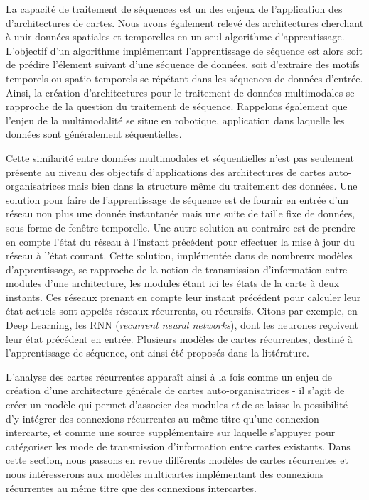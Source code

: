 \documentclass[../main]{subfiles}
\begin{document}
La capacité de traitement de séquences est un des enjeux de l'application des d'architectures de cartes. Nous avons également relevé des architectures cherchant à unir données spatiales et temporelles en un seul algorithme d'apprentissage. L'objectif d'un algorithme implémentant l'apprentissage de séquence est alors soit de prédire l'élement suivant d'une séquence de données, soit d'extraire des motifs temporels ou spatio-temporels se répétant dans les séquences de données d'entrée.
Ainsi, la création d'architectures pour le traitement de données multimodales se rapproche de la question du traitement de séquence. Rappelons également que l'enjeu de la multimodalité se situe en robotique, application dans laquelle les données sont généralement séquentielles.


Cette similarité entre données multimodales et séquentielles n'est pas seulement présente au niveau des objectifs d'applications des architectures de cartes auto-organisatrices mais bien dans la structure même du traitement des données. 
Une solution pour faire de l'apprentissage de séquence est de fournir en entrée d'un réseau non plus une donnée instantanée mais une suite de taille fixe de données, sous forme de fenêtre temporelle.
Une autre solution au contraire est de prendre en compte l'état du réseau à l'instant précédent pour effectuer la mise à jour du réseau à l'état courant. Cette solution, implémentée dans de nombreux modèles d'apprentissage, se rapproche de la notion de transmission d'information entre modules d'une architecture, les modules étant ici les états de la carte à deux instants. Ces réseaux prenant en compte leur instant précédent pour calculer leur état actuels sont appelés réseaux récurrents, ou récursifs. Citons par exemple, en Deep Learning, les RNN (\emph{recurrent neural networks}), dont les neurones reçoivent leur état précédent en entrée.
Plusieurs modèles de cartes récurrentes, destiné à l'apprentissage de séquence, ont ainsi été proposés dans la littérature.


L'analyse des cartes récurrentes apparaît ainsi à la fois comme un enjeu de création d'une architecture générale de cartes auto-organisatrices - il s'agit de créer un modèle qui permet d'associer des modules \emph{et} de se laisse la possibilité d'y intégrer des connexions récurrentes au même titre qu'une connexion intercarte, et comme une source supplémentaire sur laquelle s'appuyer pour catégoriser les mode de transmission d'information entre cartes existants. Dans cette section, nous passons en revue différents modèles de cartes récurrentes et nous intéresserons aux modèles multicartes implémentant des connexions récurrentes au même titre que des connexions intercartes.
\end{document}

